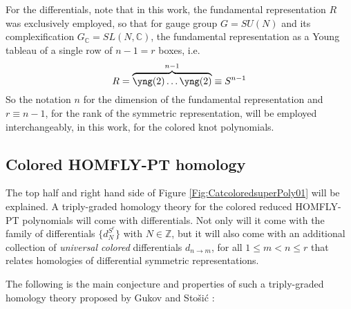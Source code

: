 \documentclass[a4paper,titlepage,twoside]{book}
\begin{document}
For the differentials, note that in this work, the fundamental representation $R$ was exclusively employed, so that for gauge group $G=SU(N)$ and its complexification $G_{\mathbb{C}}=SL(N,\mathbb{C})$, the fundamental representation as a Young tableau of a single row of $n-1=r$ boxes, i.e. 
\[
R = \overbrace{ \yng(2) \dots \yng(2) }^{n-1}  \equiv S^{n-1}
\]
So the notation $n$ for the dimension of the fundamental representation and $r\equiv n-1$, for the rank of the symmetric representation, will be employed interchangeably, in this work, for the colored knot polynomials. 




\subsection{Colored HOMFLY-PT homology}

The top half and right hand side of Figure \ref{Fig:CatcoloredsuperPoly01} will be explained.  A triply-graded homology theory for the colored reduced HOMFLY-PT polynomials will come with differentials.  Not only will it come with the family of differentials $\lbrace d_N^{S^r}\rbrace$ with $N \in \mathbb{Z}$, but it will also come with an additional collection of \emph{universal colored} differentials $d_{n\to m}$, for all $1 \leq m < n \leq r$ that relates homologies of differential symmetric representations.  

The following is the main conjecture and properties of such a triply-graded homology theory proposed by Gukov and Sto\v{s}i\'{c} \cite{GukovStosic2012}:
\end{document}
